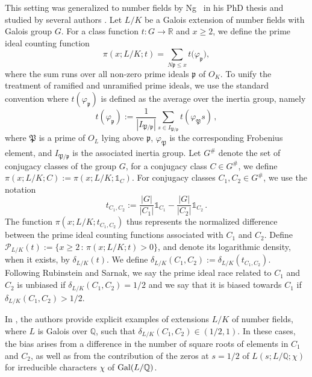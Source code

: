 \documentclass[12pt]{amsart}
\numberwithin{equation}{section}
\newcommand{\Gal}{{\rm Gal}}
\newcommand{\Q}{\mathbb Q}
\newcommand{\R}{\mathbb R}
\theoremstyle{definition}
\theoremstyle{remark}
\begin{document}
This setting was generalized to number fields by Ng~\cite{Ng} in his PhD thesis and studied by several authors \cites{FJ, Dev, Bail, Hay, BaHa}. Let $L/K$ be a Galois extension of number fields with Galois group $G$. For a class function $t:G\to \R$ and $x\ge2$, we define the prime ideal counting function
\begin{equation}
    \pi(x;L/K;t)=\sum_{N\mathfrak{p}\le x} t\bigl(\varphi_\mathfrak{p}\bigr),
\end{equation}
where the sum runs over all non-zero prime ideals $\mathfrak{p}$ of $O_K$. To unify the treatment of ramified and unramified prime ideals, we use the standard convention where $t(\varphi_\mathfrak{p})$ is defined as the average over the inertia group, namely
\[ t(\varphi_\mathfrak{p}) := \frac{1}{|I_{\mathfrak{P}/\mathfrak{p}}|} \sum_{s\in I_{\mathfrak{P}/\mathfrak{p}}}t(\varphi_{\mathfrak{P}} s)\, , \]
where $\mathfrak{P}$ is a prime of $O_L$ lying above $\mathfrak{p}$, $\varphi_{\mathfrak{P}}$ is the corresponding Frobenius element, and $I_{\mathfrak{P}/\mathfrak{p}}$ is the associated inertia group. Let $G^\#$ denote the set of conjugacy classes of the group $G$, for a conjugacy class $C\in G^\#$, we define $\pi(x;L/K;C) := \pi(x;L/K;\mathds{1}_C)$. For conjugacy classes $C_1,C_2\in G^\#$, we use the notation
\begin{equation}\label{tC_1C_2}
    t_{C_1,C_2}:=\frac{|G|}{|C_1|}\mathds{1}_{C_1}-\frac{|G|}{|C_2|}\mathds{1}_{C_2}\, .
\end{equation}
The function $\pi(x;L/K;t_{C_1,C_2})$ thus represents the normalized difference between the prime ideal counting functions associated with $C_1$ and $C_2$. Define $\mathcal{P}_{L/K}(t):=\{x\ge 2\, \colon\,  \pi(x;L/K;t)>0\}$, and denote its logarithmic density, when it exists, by $\delta_{L/K}(t)$. We define $\delta_{L/K}(C_1,C_2):=\delta_{L/K}(t_{C_1,C_2})$. Following Rubinstein and Sarnak, we say the prime ideal race related to $C_1$ and $C_2$ is unbiased if $\delta_{L/K}(C_1,C_2)=1/2$ and we say that it is biased towards $C_1$ if $\delta_{L/K}(C_1,C_2)>1/2$. 

In \cites{Ng, FJ, Bail}, the authors provide explicit examples of extensions $L/K$ of number fields, where $L$ is Galois over $\Q$, such that $\delta_{L/K}(C_1,C_2)\in (1/2, 1)$. In these cases, the bias arises from a difference in the number of square roots of elements in $C_1$ and $C_2$, as well as from the contribution of the zeros at $s=1/2$ of $L(s; L/\Q; \chi)$ for irreducible characters $\chi$ of $\Gal(L/\Q)$.
\end{document}
